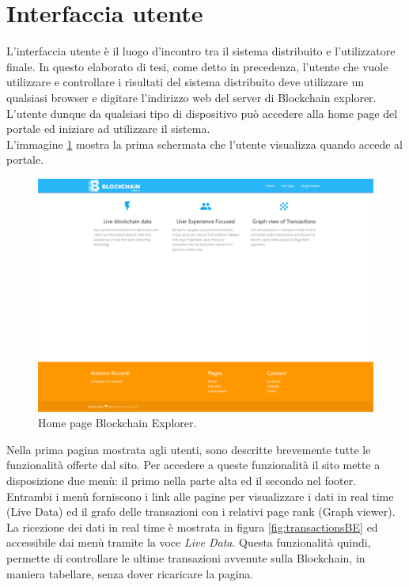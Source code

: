 \section{Interfaccia utente}
\label{sec:userInterface}
L'interfaccia utente è il luogo d'incontro tra il sistema distribuito e l'utilizzatore finale. In questo elaborato di tesi, come detto in precedenza, l'utente che vuole utilizzare e controllare i risultati del sistema distribuito deve utilizzare un qualsiasi browser e digitare l'indirizzo web del server di Blockchain explorer. L'utente dunque da qualsiasi tipo di dispositivo può accedere alla home page del portale ed iniziare ad utilizzare il sistema.
\\L'immagine \ref{fig:homePage} mostra la prima schermata che l'utente visualizza quando accede al portale.
\begin{figure}[H]
	\centering
	\includegraphics[width=\textwidth, height=0.70\textheight]{images/homePage.png}
	\caption{Home page Blockchain Explorer.}
	\label{fig:homePage}
\end{figure}
Nella prima pagina mostrata agli utenti, sono descritte brevemente tutte le funzionalità offerte dal sito. Per accedere a queste funzionalità il sito mette a disposizione due menù: il primo nella parte alta ed il secondo nel footer. Entrambi i menù forniscono i link alle pagine per visualizzare i dati in real time (Live Data) ed il grafo delle transazioni con i relativi page rank (Graph viewer).
\\La ricezione dei dati in real time è mostrata in figura \ref{fig:transactionsBE} ed accessibile dai menù tramite la voce \textit{Live Data}. Questa funzionalità quindi, permette di controllare le ultime transazioni avvenute sulla Blockchain, in maniera tabellare, senza dover ricaricare la pagina.
